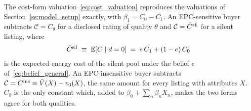 \label{lem:cost_form}
The cost-form valuation~\eqref{eq:cost_valuation} reproduces the valuations of Section~\ref{ss:model_setup} exactly, with $\beta_1=C_0-C_1$. An EPC-sensitive buyer subtracts $\mathcal C=C_\theta$ for a disclosed rating of quality $\theta$ and $\mathcal C=\bar C^{\rm sil}$ for a silent listing, where
\begin{equation}
    \bar C^{\rm sil}\;\equiv\;\mathbb E[C\mid d=0]\;=\;e\,C_1+(1-e)\,C_0
    \label{eq:csil}
\end{equation}
is the expected energy cost of the silent pool under the belief $e$ of~\eqref{eq:belief_general}. An EPC-insensitive buyer subtracts $\mathcal C=C^{\rm ins}\equiv\bar V(X)-v_0(X)$, the same amount for every listing with attributes $X$. $C_0$ is the only constant which, added to $\beta_0+\sum_n\beta_nX_n$, makes the two forms agree for both qualities.
